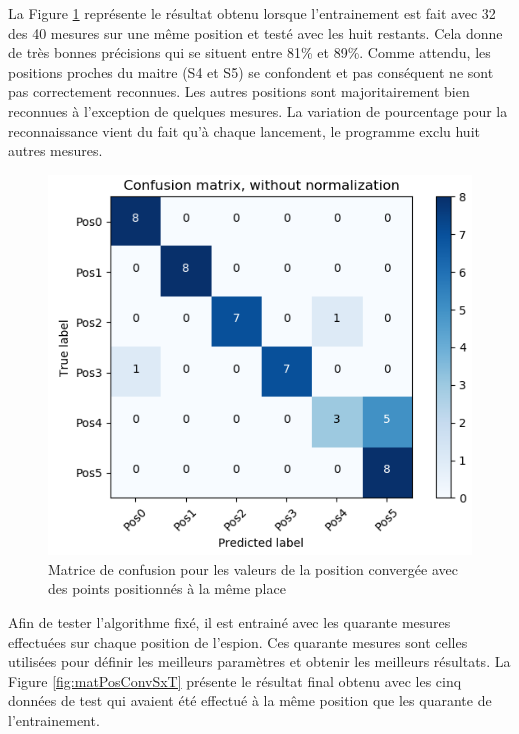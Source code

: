 La Figure \ref{fig:matPosConvSx} représente le résultat obtenu lorsque l'entrainement est fait avec 32 des 40 mesures sur une même position et testé avec les huit restants. Cela donne de très bonnes précisions qui se situent entre 81\% et 89\%. Comme attendu, les positions proches du maitre (S4 et S5) se confondent et pas conséquent ne sont pas correctement reconnues. Les autres positions sont majoritairement bien reconnues à l'exception de quelques mesures. La variation de pourcentage pour la reconnaissance vient du fait qu'à chaque lancement, le programme exclu huit autres mesures.

\begin{figure}[htp]
 \begin{center}
  \includegraphics[scale=0.5]{figures/mat_pos_conv_Sx_2.PNG}
  \caption{Matrice de confusion pour les valeurs de la position convergée avec des points positionnés à la même place}
  \label{fig:matPosConvSx} %
 \end{center}
\end{figure}

Afin de tester l'algorithme fixé, il est entrainé avec les quarante mesures effectuées sur chaque position de l'espion. Ces quarante mesures sont celles utilisées pour définir les meilleurs paramètres et obtenir les meilleurs résultats. La Figure \ref{fig:matPosConvSxT} présente le résultat final obtenu avec les cinq données de test qui avaient été effectué à la même position que les quarante de l'entrainement. 

